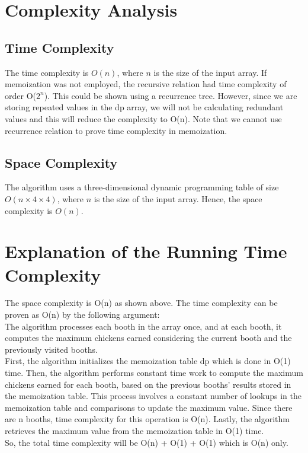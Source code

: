 \documentclass{article}
\begin{document}
\section{Complexity Analysis}
    \subsection{Time Complexity}
         The time complexity is $O(n)$, where $n$ is the size of the input array. If memoization was not employed, the recursive relation had time complexity of order O(\(2^n\)). This could be shown using a recurrence tree. However, since we are storing repeated values in the dp array, we will not be calculating redundant values and this will reduce the complexity to O(n). Note that we cannot use recurrence relation to prove time complexity in memoization.

    \subsection{Space Complexity}
        The algorithm uses a three-dimensional dynamic programming table of size $O(n \times 4 \times 4)$, where $n$ is the size of the input array. Hence, the space complexity is $O(n)$.


\section{Explanation of the Running Time Complexity}
    The space complexity is O(n) as shown above. The time complexity can be proven as O(n) by the following argument:
    \\
    The algorithm processes each booth in the array once, and at each booth, it computes the maximum chickens earned considering the current booth and the previously visited booths.
    \\
    First, the algorithm initializes the memoization table dp which is done in O(1) time.
    Then, the algorithm performs constant time work to compute the maximum chickens earned for each booth, based on the previous booths' results stored in the memoization table. This process involves a constant number of lookups in the memoization table and comparisons to update the maximum value. Since there are n booths, time complexity for this operation is O(n).
    Lastly, the algorithm retrieves the maximum value from the memoization table in O(1) time.
    \\
    So, the total time complexity will be O(n) + O(1) + O(1) which is O(n) only.
\end{document}

